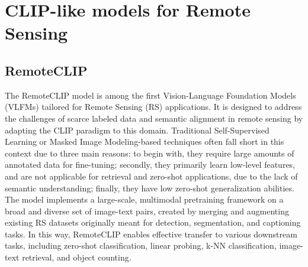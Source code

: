 \documentclass[a4paper, oneside, english]{sapthesis} %
\begin{document}

\section{CLIP-like models for Remote Sensing}

\subsection{RemoteCLIP}

The RemoteCLIP model \cite{liu2024remoteclip} is among the first Vision-Language Foundation Models (VLFMs) tailored for Remote Sensing (RS) applications. It is designed to address the challenges of scarce labeled data and semantic alignment in remote sensing by adapting the CLIP paradigm to this domain. Traditional Self-Supervised Learning or Masked Image Modeling-based techniques often fall short in this context due to three main reasons: to begin with, they require large amounts of annotated data for fine-tuning; secondly, they primarily learn low-level features, and are not applicable for retrieval and zero-shot applications, due to the lack of semantic understanding; finally, they have low zero-shot generalization abilities.
The model implements a large-scale, multimodal pretraining framework on a broad and diverse set of image-text pairs, created by merging and augmenting existing RS datasets originally meant for detection, segmentation, and captioning tasks. In this way, RemoteCLIP enables effective transfer to various downstream tasks, including zero-shot classification, linear probing, k-NN classification, image-text retrieval, and object counting.
\end{document}

